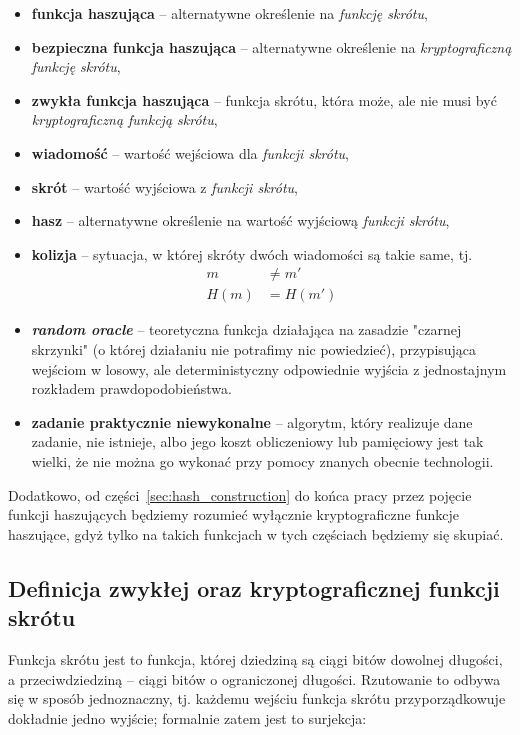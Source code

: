 \documentclass[12pt,a4paper,twoside]{article}
\begin{document}
\begin{itemize}
\item \textbf{funkcja haszująca} -- alternatywne określenie na \emph{funkcję
skrótu},
\item \textbf{bezpieczna funkcja haszująca} -- alternatywne określenie na
\emph{kryptograficzną funkcję skrótu},
\item \textbf{zwykła funkcja haszująca} -- funkcja skrótu, która może, ale nie
musi być \emph{kryptograficzną funkcją skrótu},
\item \textbf{wiadomość} -- wartość wejściowa dla \emph{funkcji skrótu},
\item \textbf{skrót} -- wartość wyjściowa z \emph{funkcji skrótu},
\item \textbf{hasz} -- alternatywne określenie na wartość wyjściową
\emph{funkcji skrótu},
\item \textbf{kolizja} -- sytuacja, w której skróty dwóch wiadomości są takie
same, tj.
\[
    \begin{aligned}
    m &\neq m' \\
    H(m) &= H(m')
    \end{aligned}
\]
\item \textbf{\textit{random oracle}} -- teoretyczna funkcja działająca na
zasadzie "czarnej skrzynki" (o której działaniu nie potrafimy nic powiedzieć),
przypisująca wejściom w losowy, ale deterministyczny odpowiednie wyjścia z
jednostajnym rozkładem prawdopodobieństwa.
\item \textbf{zadanie praktycznie niewykonalne} -- algorytm, który realizuje
dane zadanie, nie istnieje, albo jego koszt obliczeniowy lub pamięciowy jest
tak wielki, że nie można go wykonać przy pomocy znanych obecnie technologii.
\end{itemize}

Dodatkowo, od części~\ref{sec:hash_construction} do końca pracy przez pojęcie
funkcji haszujących będziemy rozumieć wyłącznie kryptograficzne funkcje
haszujące, gdyż tylko na takich funkcjach w tych częściach będziemy się
skupiać.
\pagebreak



\subsection{Definicja zwykłej oraz kryptograficznej funkcji skrótu}

Funkcja skrótu jest to funkcja, której dziedziną są ciągi bitów dowolnej
długości, a przeciwdziedziną -- ciągi bitów o ograniczonej długości. Rzutowanie
to odbywa się w sposób jednoznaczny, tj. każdemu wejściu funkcja skrótu
przyporządkowuje dokładnie jedno wyjście; formalnie zatem jest to surjekcja:
\end{document}
